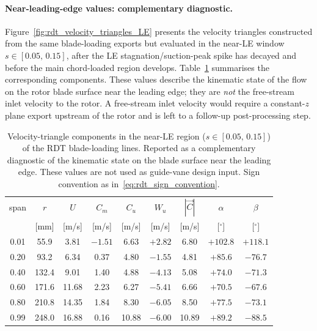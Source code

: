 \paragraph{Near-leading-edge values: complementary diagnostic.}
Figure~\ref{fig:rdt_velocity_triangles_LE} presents the velocity
triangles constructed from the same blade-loading exports but evaluated
in the near-LE window $s\in[0.05,\,0.15]$, after the LE
stagnation/suction-peak spike has decayed and before the main
chord-loaded region develops. Table~\ref{tab:rdt_le_values} summarises
the corresponding components. These values describe the kinematic state
of the flow on the rotor blade surface near the leading edge; they are
\emph{not} the free-stream inlet velocity to the rotor. A free-stream
inlet velocity would require a constant-$z$ plane export upstream of
the rotor and is left to a follow-up post-processing step.
 
\begin{table}[H]
  \centering
  \caption[RDT near-LE velocity triangle at six spans]{Velocity-triangle
  components in the near-LE region ($s\in[0.05,\,0.15]$) of the RDT
  blade-loading lines. Reported as a complementary diagnostic of the
  kinematic state on the blade surface near the leading edge. These
  values are not used as guide-vane design input. Sign convention as
  in~\eqref{eq:rdt_sign_convention}.}
  \label{tab:rdt_le_values}
  \begin{tabular}{ccccccccc}
    \hline
    span & $r$ & $U$ & $C_m$ & $C_u$ & $W_u$ & $|\vec{C}|$ & $\alpha$ & $\beta$ \\
         & [mm] & [m/s] & [m/s] & [m/s] & [m/s] & [m/s] & [$^\circ$] & [$^\circ$] \\
    \hline
    0.01 &  55.9 &  3.81 & $-1.51$ &  6.63 & $+2.82$ &  6.80 & $+102.8$ & $+118.1$ \\
    0.20 &  93.2 &  6.34 &   0.37  &  4.80 & $-1.55$ &  4.81 &  $+85.6$ &  $-76.7$ \\
    0.40 & 132.4 &  9.01 &   1.40  &  4.88 & $-4.13$ &  5.08 &  $+74.0$ &  $-71.3$ \\
    0.60 & 171.6 & 11.68 &   2.23  &  6.27 & $-5.41$ &  6.66 &  $+70.5$ &  $-67.6$ \\
    0.80 & 210.8 & 14.35 &   1.84  &  8.30 & $-6.05$ &  8.50 &  $+77.5$ &  $-73.1$ \\
    0.99 & 248.0 & 16.88 &   0.16  & 10.88 & $-6.00$ & 10.89 &  $+89.2$ &  $-88.5$ \\
    \hline
  \end{tabular}
\end{table}
 
